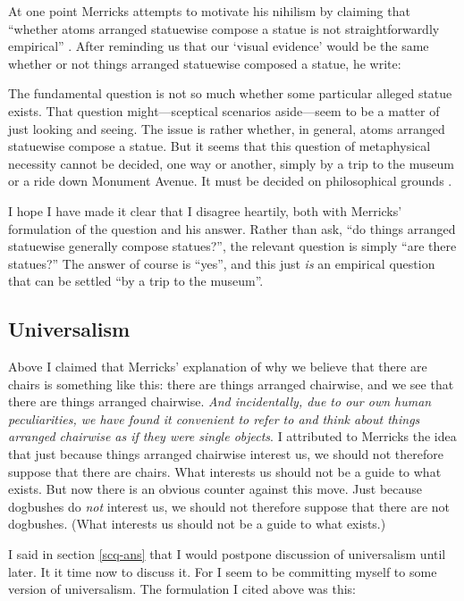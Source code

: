 \documentclass[11pt]{article}
\newenvironment{squote}{%
\begin{spacing}{1}
       	\begin{list}{}{%
\setlength{\labelwidth}{0pt}%
\rightmargin\leftmargin%
}
\item\relax
}{%
\end{list}%
\end{spacing}
}
\begin{document}
\begin{spacing}{1.25}
At one point Merricks attempts to motivate his nihilism by claiming
that ``whether atoms arranged statuewise compose a statue is not
straightforwardly empirical'' \citeyearpar[9]{merricks2001a}.  After
reminding us that our `visual evidence' would be the same whether or
not things arranged statuewise composed a statue, he write:

\begin{squote}
The fundamental question is not so much whether some particular
alleged statue exists.  That question might---sceptical scenarios
aside---seem to be a matter of just looking and seeing.  The issue is
rather whether, in general, atoms arranged statuewise compose a
statue.  But it seems that this question of metaphysical necessity
cannot be decided, one way or another, simply by a trip to the museum
or a ride down Monument Avenue.  It must be decided on philosophical
grounds \citeyearpar[9]{merricks2001a}.
\end{squote}

I hope I have made it clear that I disagree heartily, both with
Merricks' formulation of the question and his answer.  Rather than
ask, ``do things arranged statuewise generally compose statues?'', the
relevant question is simply ``are there statues?''  The answer of
course is ``yes'', and this just {\em is} an empirical question that
can be settled ``by a trip to the museum''.

\subsection{Universalism}
\label{universalism}
Above I claimed that Merricks' explanation of why we believe that
there are chairs is something like this: there are things arranged
chairwise, and we see that there are things arranged chairwise.  {\em
  And incidentally, due to our own human peculiarities, we have found
  it convenient to refer to and think about things arranged chairwise
  as if they were single objects}.  I attributed to Merricks the idea
that just because things arranged chairwise interest us, we should not
therefore suppose that there are chairs.  What interests us should not
be a guide to what exists.  But now there is an obvious counter
against this move.  Just because dogbushes do {\em not} interest us,
we should not therefore suppose that there are not dogbushes.  (What
interests us should not be a guide to what exists.)

I said in section \ref{scq-ans} that I would postpone discussion of
universalism until later.  It it time now to discuss it.  For I seem
to be committing myself to some version of universalism.  The
formulation I cited above was this:


\end{spacing}
\end{document}
